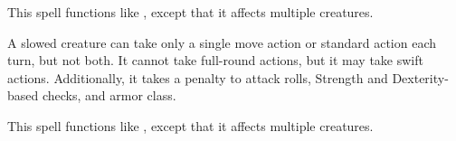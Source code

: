\begin{spelleffect}
  This spell functions like , except that it affects multiple creatures.
\end{spelleffect}

\spellrng{\rngclose}
\spelldur{\durshort}
\begin{spelleffect}
    A slowed creature can take only a single move action or standard action each turn, but not both. It cannot take full-round actions, but it may take swift actions. Additionally, it takes a  penalty to attack rolls, Strength and Dexterity-based checks, and armor class.
\end{spelleffect}

\spellrng{\rngmed}
\begin{spelleffect}
  This spell functions like , except that it affects multiple creatures.
\end{spelleffect}

